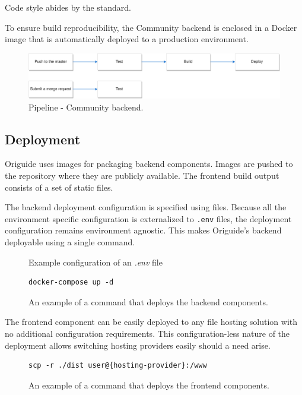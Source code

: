 \medskip
Code style abides by the  standard.

\medskip
To ensure build reproducibility, the Community backend is enclosed in a Docker image that is automatically deployed to a production environment. 

\begin{figure}[H]
  \caption{Pipeline - Community backend.}
  \centering
    \includegraphics[width=\textwidth]{assets/3-community-pipeline.png}
\end{figure}

\subsection{Deployment}

Origuide uses  images for packaging backend components. Images are pushed to the  repository where they are publicly available. The frontend build output consists of a set of static files.

\medskip
The backend deployment configuration is specified using  files. 
Because all the environment specific configuration is externalized to \texttt{.env} files, the deployment configuration remains environment agnostic. This makes Origuide's backend deployable using a single command.

\begin{figure}[H]
	\caption{Example configuration of an \textit{.env} file}
	
\end{figure}

\begin{figure}[H]
	\caption{An example of a command that deploys the backend components.}
	\begin{lstlisting}
docker-compose up -d
	\end{lstlisting}
\end{figure}

The frontend component can be easily deployed to any file hosting solution with no additional configuration requirements.
This configuration-less nature of the deployment allows switching hosting providers easily should a need arise.

\begin{figure}[H]
	\caption{An example of a command that deploys the frontend components.}
	\begin{lstlisting}
scp -r ./dist user@{hosting-provider}:/www 
	\end{lstlisting}
\end{figure}
\medskip

